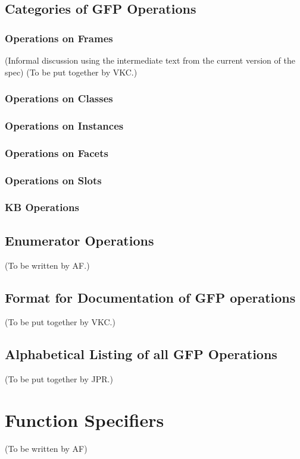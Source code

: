 \section{Categories of GFP Operations}

\subsection{Operations on Frames}
(Informal discussion using the intermediate text from the current version of the spec)
(To be put together by VKC.)

\subsection{Operations on Classes}

\subsection{Operations on Instances}

\subsection{Operations on Facets}

\subsection{Operations on Slots}

\subsection{KB Operations}

\section{Enumerator Operations}
(To be written by AF.) 

\section{Format for Documentation of GFP operations}
(To be put together by VKC.)

\section{Alphabetical Listing of all GFP Operations}
(To be put together by JPR.)

\chapter{Function Specifiers}
(To be written by AF)

